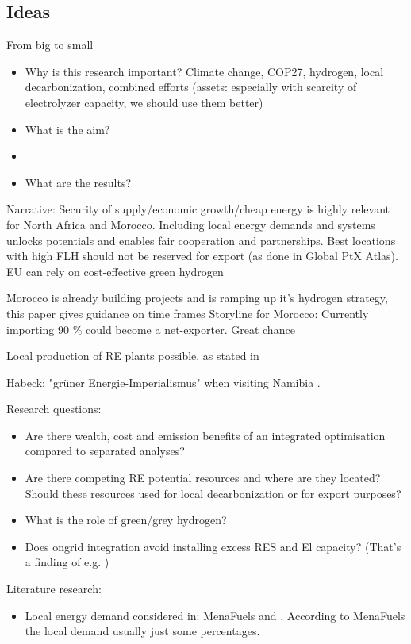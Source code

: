 
\subsection{Ideas}
From big to small
\begin{itemize}
    \item Why is this research important? Climate change, COP27, hydrogen, local decarbonization, combined efforts (assets: especially with scarcity of electrolyzer capacity, we should use them better)
    \item What is the aim?
    \item 
    \item What are the results?
\end{itemize}
Narrative: 
Security of supply/economic growth/cheap energy is highly relevant for North Africa and Morocco. 
Including local energy demands and systems unlocks potentials and enables fair cooperation and partnerships.
Best locations with high FLH should not be reserved for export (as done in Global PtX Atlas). 
EU can rely on cost-effective green hydrogen

Morocco is already building projects and is ramping up it's hydrogen strategy, this paper gives guidance on time frames
Storyline for Morocco: Currently importing 90 \% could become a net-exporter. Great chance

Local production of RE plants possible, as stated in \cite{Ersoy2022}

Habeck: "gr{\"u}ner Energie-Imperialismus" when visiting Namibia \cite{HabeckEnergieimperialismus}.


Research questions:
\begin{itemize}
    \item Are there wealth, cost and emission benefits of an integrated optimisation compared to separated analyses?
    \item Are there competing RE potential resources and where are they located? Should these resources used for local decarbonization or for export purposes?
    \item What is the role of green/grey hydrogen?   
    \item Does ongrid integration avoid installing excess RES and El capacity? (That's a finding of e.g. \cite{Ruhnau2022})
\end{itemize}

Literature research:
\begin{itemize}
    \item Local energy demand considered in: MenaFuels and \cite{Hampp2021}. According to MenaFuels the local demand usually just some percentages.
\end{itemize}


